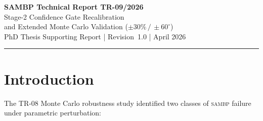 \documentclass[12pt,a4paper]{article}
\newcommand{\SAMBP}{\textsc{sambp}}
\begin{document}
\begin{center}
  {\LARGE\bfseries\color{sambpblue}
    SAMBP Technical Report TR-09/2026}\\[6pt]
  {\large Stage-2 Confidence Gate Recalibration\\
    and Extended Monte Carlo Validation ($\pm30\%\,/\,\pm60^\circ$)}\\[10pt]
  {\normalsize PhD Thesis Supporting Report \quad|\quad
    Revision~1.0 \quad| April 2026}
\end{center}

\vspace{4pt}\hrule\vspace{8pt}

\begin{abstract}
\noindent
TR-08~\citep{SAMBP_TR08} identified two root causes of \SAMBP{}
Monte Carlo performance degradation: (i)~systematic Stage-2 veto of
generator-terminal bus faults due to Levenberg--Marquardt~\citep{Levenberg1944,Marquardt1963}
(LM) estimator upper-bound clipping, and (ii)~spurious transformer
differential trips from an independent-winding DC perturbation model
artefact.  This report
implements the corresponding corrections — dynamic upper-bound expansion
and amplitude-only transformer winding perturbation — and re-evaluates
\SAMBP{} under the extended parametric bounds recommended in TR-08
($\pm30\,\%$ current, $\pm60^\circ$ inception angle, $\pm30\,\%$ DC,
$\pm20\,\%$ time-constant, $N=200$ per scenario, seed~2026).  The
corrected 4\,000-trial study achieves \SAMBP{} TPR~=~1.000,
FPR~=~0.000, and a correct veto rate of 1.000 across all 20 scenarios,
recovering and extending the nominal selectivity of TR-05 under the
widest perturbation envelope tested to date.
\end{abstract}

\tableofcontents
\listoffigures
\listoftables
\newpage

\section{Introduction}

The TR-08 Monte Carlo robustness study identified two classes of
\SAMBP{} failure under parametric perturbation:
\end{document}

